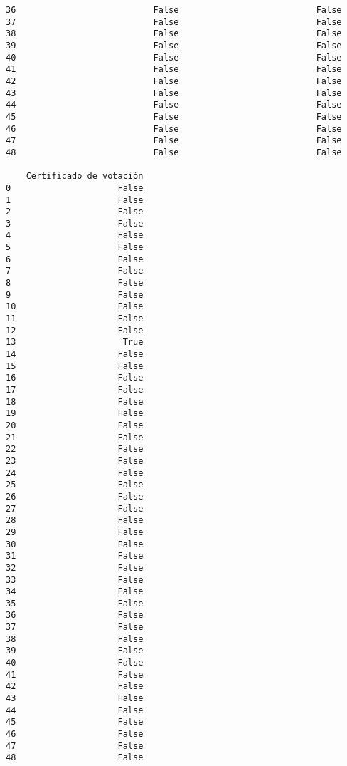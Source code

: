 \documentclass[11pt]{article}
\begin{document}
\begin{Verbatim}[commandchars=\\\{\}]
36                           False                           False   
37                           False                           False   
38                           False                           False   
39                           False                           False   
40                           False                           False   
41                           False                           False   
42                           False                           False   
43                           False                           False   
44                           False                           False   
45                           False                           False   
46                           False                           False   
47                           False                           False   
48                           False                           False   

    Certificado de votación  
0                     False  
1                     False  
2                     False  
3                     False  
4                     False  
5                     False  
6                     False  
7                     False  
8                     False  
9                     False  
10                    False  
11                    False  
12                    False  
13                     True  
14                    False  
15                    False  
16                    False  
17                    False  
18                    False  
19                    False  
20                    False  
21                    False  
22                    False  
23                    False  
24                    False  
25                    False  
26                    False  
27                    False  
28                    False  
29                    False  
30                    False  
31                    False  
32                    False  
33                    False  
34                    False  
35                    False  
36                    False  
37                    False  
38                    False  
39                    False  
40                    False  
41                    False  
42                    False  
43                    False  
44                    False  
45                    False  
46                    False  
47                    False  
48                    False  

    \end{Verbatim}
\end{document}
